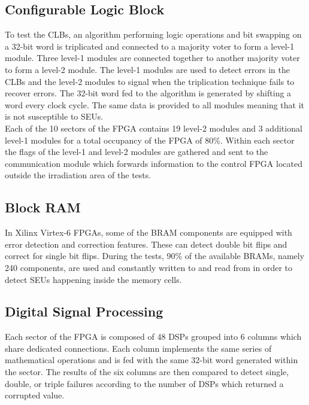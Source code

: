     \subsection{Configurable Logic Block}

      To test the CLBs, an algorithm performing logic operations and bit swapping on a 32-bit word is triplicated and connected to a majority voter to form a level-1 module. Three level-1 modules are connected together to another majority voter to form a level-2 module. The level-1 modules are used to detect errors in the CLBs and the level-2 modules to signal when the triplication technique fails to recover errors. The 32-bit word fed to the algorithm is generated by shifting a word every clock cycle. The same data is provided to all modules meaning that it is not susceptible to SEUs. \\

      Each of the 10 sectors of the FPGA contains 19 level-2 modules and 3 additional level-1 modules for a total occupancy of the FPGA of 80\%. Within each sector the flags of the level-1 and level-2 modules are gathered and sent to the communication module which forwards information to the control FPGA located outside the irradiation area of the tests.

    \subsection{Block RAM}

      In Xilinx Virtex-6 FPGAs, some of the BRAM components are equipped with error detection and correction features. These can detect double bit flips and correct for single bit flips. During the tests, 90\% of the available BRAMs, namely 240 components, are used and constantly written to and read from in order to detect SEUs happening inside the memory cells.

    \subsection{Digital Signal Processing}

      Each sector of the FPGA is composed of 48 DSPs grouped into 6 columns which share dedicated connections. Each column implements the same series of mathematical operations and is fed with the same 32-bit word generated within the sector. The results of the six columns are then compared to detect single, double, or triple failures according to the number of DSPs which returned a corrupted value.

